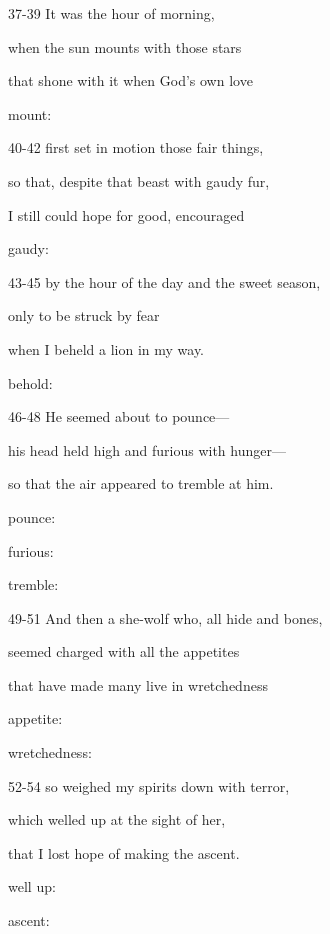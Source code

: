 \documentclass[oneside]{ctexbook}
\begin{document}
\begin{mytext}{37-39}
It was the hour of morning,

when the sun mounts with those stars

that shone with it when God's own love

\tcblower

mount:
\end{mytext}

\begin{mytext}{40-42}
first set in motion those fair things,

so that, despite that beast with gaudy fur,

I still could hope for good, encouraged

\tcblower

gaudy:
\end{mytext}

\begin{mytext}{43-45}
by the hour of the day and the sweet season,

only to be struck by fear

when I beheld a lion in my way.

\tcblower

behold:
\end{mytext}

\begin{mytext}{46-48}
He seemed about to pounce—

his head held high and furious with hunger—

so that the air appeared to tremble at him.

\tcblower

pounce:

furious:

tremble:
\end{mytext}

\begin{mytext}{49-51}
And then a she-wolf who, all hide and bones,

seemed charged with all the appetites

that have made many live in wretchedness

\tcblower

appetite:

wretchedness:
\end{mytext}

\begin{mytext}{52-54}
so weighed my spirits down with terror,

which welled up at the sight of her,

that I lost hope of making the ascent.

\tcblower

well up:

ascent:
\end{mytext}
\end{document}
